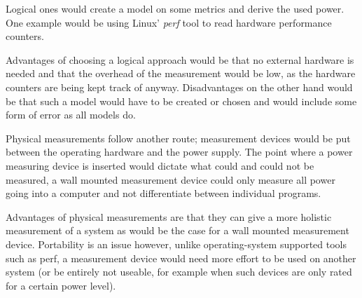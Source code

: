 Logical ones would create a model on some metrics and derive the used power. One example would be using Linux' \emph{perf} tool to read hardware performance counters. 

Advantages of choosing a logical approach would be that no external hardware is needed and that the overhead of the measurement would be low, as the hardware counters are being kept track of anyway. 
Disadvantages on the other hand would be that such a model would have to be created or chosen and would include some form of error as all models do.

Physical measurements follow another route; measurement devices would be put between the operating hardware and the power supply. 
The point where a power measuring device is inserted would dictate what could and could not be measured, a wall mounted measurement device could only measure all power going into a computer and not differentiate between individual programs.

Advantages of physical measurements are that they can give a more holistic measurement of a system as would be the case for a wall mounted measurement device. 
Portability is an issue however, unlike operating-system supported tools such as perf, a measurement device would need more effort to be used on another system (or be entirely not useable, for example when such devices are only rated for a certain power level).